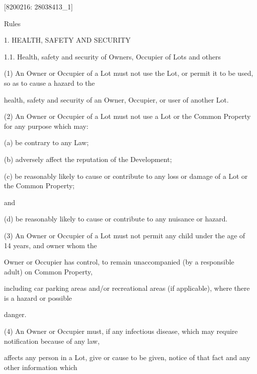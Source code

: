 \documentclass{article}
\begin{document}
\newpage
















{\fontsize{7.02}{1}[8200216: 28038413\_1] }

{\fontsize{10.02}{1}Rules }

{\fontsize{9.99}{1}1. HEALTH, SAFETY AND SECURITY }

{\fontsize{9.99}{1}1.1. Health, safety and security of Owners, Occupier of Lots and others }

{\fontsize{9.962}{1}(1) An Owner or Occupier of a Lot must not use the Lot, or permit it to be used, so as to cause a hazard to the }

{\fontsize{10.02}{1}health, safety and security of an Owner, Occupier, or user of another Lot. }

{\fontsize{9.962}{1}(2) An Owner or Occupier of a Lot must not use a Lot or the Common Property for any purpose which may: }

{\fontsize{9.962}{1}(a) be contrary to any Law; }

{\fontsize{9.962}{1}(b) adversely affect the reputation of the Development;  }

{\fontsize{9.962}{1}(c) be reasonably likely to cause or contribute to any loss or damage of a Lot or the Common Property; }

{\fontsize{10.02}{1}and }

{\fontsize{9.962}{1}(d) be reasonably likely to cause or contribute to any nuisance or hazard. }

{\fontsize{9.962}{1}(3) An Owner or Occupier of a Lot must not permit any child under the age of 14 years, and owner whom the }

{\fontsize{10.02}{1}Owner or Occupier has control, to remain unaccompanied (by a responsible adult) on Common Property, }

{\fontsize{10.02}{1}including car parking areas and/or recreational areas (if applicable), where there is a hazard or possible }

{\fontsize{10.02}{1}danger. }

{\fontsize{9.962}{1}(4) An Owner or Occupier must, if any infectious disease, which may require notification because of any law, }

{\fontsize{10.02}{1}affects any person in a Lot, give or cause to be given, notice of that fact and any other information which }
\end{document}
